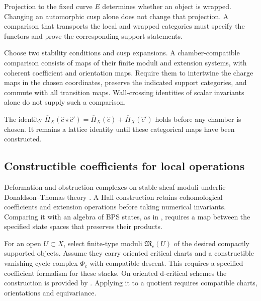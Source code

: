 \begin{remark}
\label{rem:chamber-dependence-wrapped}
Projection to the fixed curve $E$ determines whether an object is
wrapped.  Changing an automorphic cusp alone does not change that
projection.  A comparison that transports the local and wrapped
categories must specify the functors and prove the corresponding
support statements.
\end{remark}

\begin{definition}
\label{def:chamber-compatible-hall-descent}
Choose two stability conditions and cusp expansions.
A chamber-compatible comparison consists of maps of their finite
moduli and extension systems, with coherent coefficient and orientation
maps.  Require them to intertwine the charge maps in the chosen
coordinates, preserve the indicated support categories, and commute
with all transition maps.  Wall-crossing identities of scalar
invariants alone do not supply such a comparison.
\end{definition}

The identity
$\overline\Pi_X(\widehat c\star\widehat c')
=\overline\Pi_X(\widehat c)+\overline\Pi_X(\widehat c')$
holds before any chamber is chosen.  It remains a lattice identity
until these categorical maps have been constructed.

\subsection{Constructible coefficients for local operations}
\label{sec:local-protected-observable-algebra}

Deformation and obstruction complexes on stable-sheaf moduli underlie
Donaldson--Thomas theory \cite{DT}.  A Hall construction retains
cohomological coefficients and extension operations before taking
numerical invariants.  Comparing it with an algebra of BPS states,
as in \cite{HM}, requires a map between the specified state spaces
that preserves their products.

For an open $U\subset X$, select finite-type moduli
$\mathfrak M_c(U)$ of the desired compactly supported objects.
Assume they carry oriented critical charts and a constructible
vanishing-cycle complex $\Phi_c$ with compatible descent.  This
requires a specified coefficient formalism for these stacks.
On oriented d-critical schemes the construction is provided by
\cite[Theorem~6.9]{BBDJS2015}.  Applying it to a quotient requires
compatible charts, orientations and equivariance.

